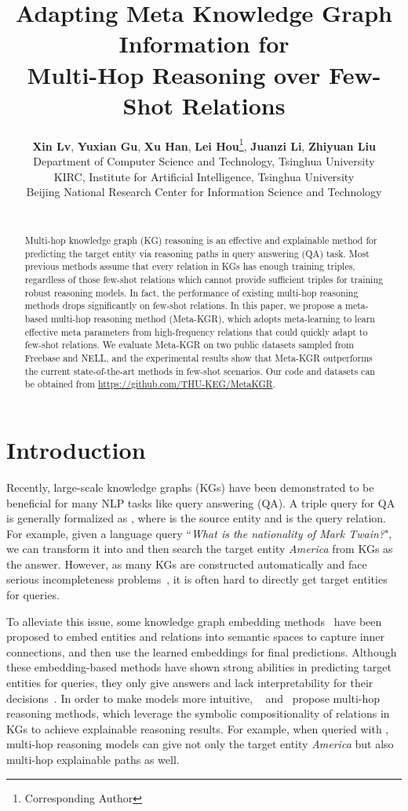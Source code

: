 \documentclass[11pt,a4paper]{article}
\title{Adapting Meta Knowledge Graph Information for \\ Multi-Hop Reasoning over Few-Shot Relations}
\author{
    \textbf{Xin Lv}, \textbf{Yuxian Gu}, \textbf{Xu Han}, \textbf{Lei Hou}\thanks{\quad Corresponding Author}\hspace{0.5em}, \textbf{Juanzi Li}, \textbf{Zhiyuan Liu}\\
    Department of Computer Science and Technology, Tsinghua University \\
    KIRC, Institute for Artificial Intelligence, Tsinghua University \\
     Beijing National Research Center for Information Science and Technology \\
    \email{\{lv-x18,gu-yx17,hanxu17\}@mails.tsinghua.edu.cn}\\
    \email{\{houlei,lijuanzi,liuzy\}@tsinghua.edu.cn}
    }
\date{}
\begin{document}
\maketitle
\begin{abstract}
Multi-hop knowledge graph (KG) reasoning is an effective and explainable method for predicting the target entity via reasoning paths in query answering (QA) task. Most previous methods assume that every relation in KGs has enough training triples, regardless of those few-shot relations which cannot provide sufficient triples for training robust reasoning models. In fact, the performance of existing multi-hop reasoning methods drops significantly on few-shot relations. In this paper, we propose a meta-based multi-hop reasoning method (Meta-KGR), which adopts meta-learning to learn effective meta parameters from high-frequency relations that could quickly adapt to few-shot relations. We evaluate Meta-KGR on two public datasets sampled from Freebase and NELL, and the experimental results show that Meta-KGR outperforms the current state-of-the-art methods in few-shot scenarios. Our code and datasets can be obtained from  \url{https://github.com/THU-KEG/MetaKGR}.

\end{abstract}

\section{Introduction}

Recently, large-scale knowledge graphs (KGs) have been demonstrated to be beneficial for many NLP tasks like query answering (QA). A triple query for QA is generally formalized as , where  is the source entity and  is the query relation. 
For example, given a language query ``\textit{What is the nationality of Mark Twain?}", we can transform it into  and then search the target entity \emph{America} from KGs as the answer.
However, as many KGs are constructed automatically and face serious incompleteness problems~\cite{TransE}, it is often hard to directly get target entities for queries.

To alleviate this issue, some knowledge graph embedding methods~\cite{TransE,ConvE} have been proposed to embed entities and relations into semantic spaces to capture inner connections, and then use the learned embeddings for final predictions. Although these embedding-based methods have shown strong abilities in predicting target entities for queries, they only give answers and lack interpretability for their decisions~\cite{MultiHop}. In order to make models more intuitive, ~\citet{MINERVA} and~\citet{MultiHop} propose multi-hop reasoning methods, which leverage the symbolic compositionality of relations in KGs to achieve explainable reasoning results. For example, when queried with , multi-hop reasoning models can give not only the target entity \textit{America} but also multi-hop explainable paths  as well.
\end{document}
